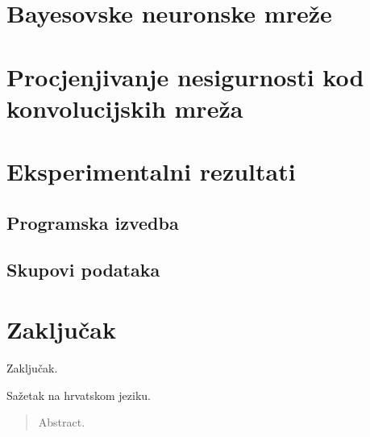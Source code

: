 \documentclass[utf8, diplomski, lmodern]{fer}
\begin{document}
		

\chapter{Bayesovske neuronske mreže}



\chapter{Procjenjivanje nesigurnosti kod konvolucijskih mreža}



\chapter{Eksperimentalni rezultati}


\section{Programska izvedba}


\section{Skupovi podataka}



\chapter{Zaključak}

Zaključak.




\begin{sazetak}
Sažetak na hrvatskom jeziku.

\end{sazetak}

\begin{abstract}
Abstract.

\end{abstract}
\end{document}
